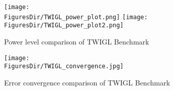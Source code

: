 \documentclass[12pt]{scrartcl}
\newcommand{\FiguresDir}{./figs}
\begin{document}

\begin{figure}[!htbp]
\centering
\texttt{[image: \\FiguresDir/TWIGL\_power\_plot.png]}
\texttt{[image: \\FiguresDir/TWIGL\_power\_plot2.png]}
\caption{Power level comparison of TWIGL Benchmark}
\label{fig:TWIGL_power}
\end{figure}


\begin{figure}[!htbp]
\centering
\texttt{[image: \\FiguresDir/TWIGL\_convergence.jpg]}
\caption{Error convergence comparison of TWIGL Benchmark}
\label{fig:TWIGL_conv}
\end{figure}
\end{document}
